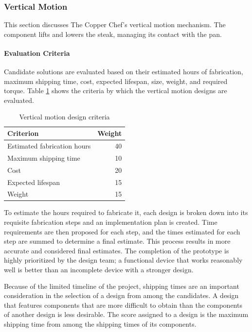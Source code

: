 \documentclass[11pt]{article}
\newcommand{\subsubsubsection}[1]{\paragraph{#1}\mbox{}}
\begin{document}
\subsubsection{Vertical Motion}

This section discusses The Copper Chef’s vertical motion mechanism.
The component lifts and lowers the steak, managing its contact with the pan.

\subsubsubsection{Evaluation Criteria}

\noindent
Candidate solutions are evaluated based on their estimated hours of fabrication, maximum shipping time, cost, expected lifespan, size, weight, and required torque.
Table \ref{table:vertical_motion_criteria} shows the criteria by which the vertical motion designs are evaluated.

\begin{table}[H]
\begin{tabularx}{\textwidth}{X  r}

\hline

Criterion & Weight \\

\hline 

Estimated fabrication hours & 40 \\
Maximum shipping time & 10 \\
Cost & 20 \\
Expected lifespan & 15 \\
Weight & 15 \\

\hline

\end{tabularx}
\caption{Vertical motion design criteria}
\label{table:vertical_motion_criteria}
\end{table}

To estimate the hours required to fabricate it, each design is broken down into its requisite fabrication steps and an implementation plan is created.
Time requirements are then proposed for each step, and the times estimated for each step are summed to determine a final estimate.
This process results in more accurate and considered final estimates.
The completion of the prototype is highly prioritized by the design team; a functional device that works reasonably well is better than an incomplete device with a stronger design.

Because of the limited timeline of the project, shipping times are an important consideration in the selection of a design from among the candidates.
A design that features components that are more difficult to obtain than the components of another design is less desirable.
The score assigned to a design is the maximum shipping time from among the shipping times of its components.
\end{document}

